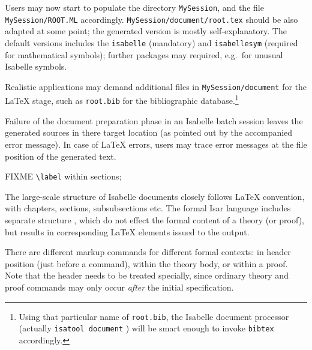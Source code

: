 \begin{isabellebody}
\begin{isamarkuptext}
  \medskip Users may now start to populate the directory
  \texttt{MySession}, and the file \texttt{MySession/ROOT.ML}
  accordingly.  \texttt{MySession/document/root.tex} should be also
  adapted at some point; the generated version is mostly
  self-explanatory.  The default versions includes the
  \texttt{isabelle} (mandatory) and \texttt{isabellesym} (required for
  mathematical symbols); further packages may required, e.g.\ for
  unusual Isabelle symbols.

  Realistic applications may demand additional files in
  \texttt{MySession/document} for the {\LaTeX} stage, such as
  \texttt{root.bib} for the bibliographic database.\footnote{Using
  that particular name of \texttt{root.bib}, the Isabelle document
  processor (actually \texttt{isatool document} \cite{isabelle-sys})
  will be smart enough to invoke \texttt{bibtex} accordingly.}

  \medskip Failure of the document preparation phase in an Isabelle
  batch session leaves the generated sources in there target location
  (as pointed out by the accompanied error message).  In case of
  {\LaTeX} errors, users may trace error messages at the file position
  of the generated text.%
\end{isamarkuptext}%
\isamarkuptrue%
%
\isamarkuptrue%
%
\isamarkuptrue%
%
\begin{isamarkuptext}%
FIXME \verb,\label, within sections;

  The large-scale structure of Isabelle documents closely follows
  {\LaTeX} convention, with chapters, sections, subsubsections etc.
  The formal Isar language includes separate structure , which do not effect the formal content of a theory (or
  proof), but results in corresponding {\LaTeX} elements issued to the
  output.

  There are different markup commands for different formal contexts:
  in header position (just before a  command),
  within the theory body, or within a proof.  Note that the header
  needs to be treated specially, since ordinary theory and proof
  commands may only occur \emph{after} the initial 
  specification.

  \smallskip


\end{isamarkuptext}
\end{isabellebody}
